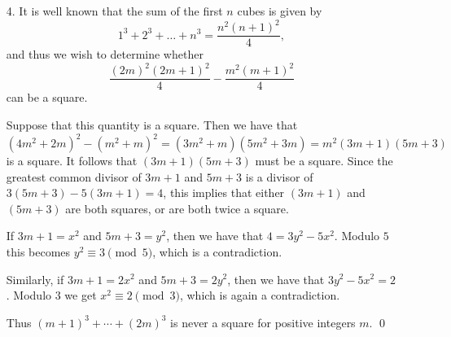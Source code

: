 \documentclass[a4paper, 12pt]{article}
\begin{document}
\begin{enumerate}
Note that when we do any change, we are changing an even number of lamps in the coloured squares, so the number of lamps turned on in those squares remains even. Thus, if only one lamp remains on, it must be in a white square. To see that these can be changed it is sufficient to notice that they are at distance $2$ from the edge. If $X$ is the square at distance $2$ from the edge and $S, T$ are the squares separating it from the edge, we have the following situation:

\begin{figure}[h]
\centering
\texttt{[image: senior\_test3\_question3\_2.mps]}
\end{figure}

We can use $T$ and change the state of $S, T, X$, and then use $S$ and change the state of $S, T$. With this only $X$ is turned on. When we used this pair of movements we have not affected any other lamp. As we wanted, $X$ is the only lamp turned on in the whole board. \qed
\vspace{5mm}

\item[4.]
It is well known that the sum of the first $n$ cubes is given by
\[
	1^3 + 2^3 + \dots + n^3 = \frac{n^2 {(n + 1)}^2}{4},
\]
and thus we wish to determine whether
\[
	\frac{{(2m)}^2 {(2m + 1)}^2}{4} - \frac{m^2 {(m + 1)}^2}{4}
\]
can be a square.

Suppose that this quantity is a square. Then we have that
\[
	{(4m^2 + 2m)}^2 - {(m^2 + m)}^2 = (3m^2 + m)(5m^2 + 3m) = m^2 (3m + 1)(5m + 3)
\]
is a square. It follows that $(3m + 1)(5m + 3)$ must be a square. Since the greatest common divisor of $3m + 1$ and $5m + 3$ is a divisor of $3(5m + 3) - 5(3m + 1) = 4$, this implies that either $(3m + 1)$ and $(5m + 3)$ are both squares, or are both twice a square.

If $3m + 1 = x^2$ and $5m + 3 = y^2$, then we have that $4 = 3y^2 - 5x^2$. Modulo $5$ this becomes $y^2 \equiv 3 \pmod 5$, which is a contradiction.

Similarly, if $3m + 1 = 2x^2$ and $5m + 3 = 2y^2$, then we have that $3y^2 - 5x^2 = 2$. Modulo $3$ we get $x^2 \equiv 2 \pmod 3$, which is again a contradiction.

Thus ${(m + 1)}^3 + \cdots + {(2m)}^3$ is never a square for positive integers $m$. \qed
\vspace{5mm}


\end{enumerate}
\end{document}
